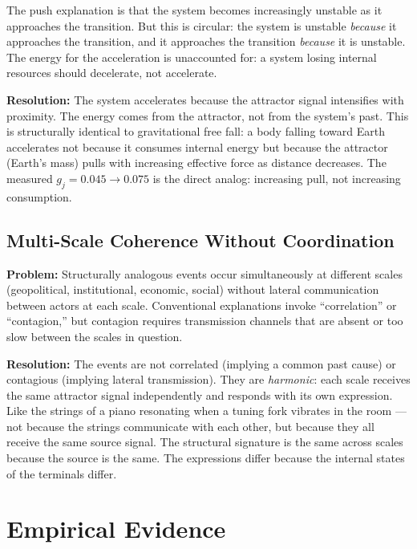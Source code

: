 \documentclass[12pt,a4paper]{article}
\newcommand{\gj}{g_j}
\begin{document}
The push explanation is that the system becomes increasingly unstable as it approaches the transition. But this is circular: the system is unstable \emph{because} it approaches the transition, and it approaches the transition \emph{because} it is unstable. The energy for the acceleration is unaccounted for: a system losing internal resources should decelerate, not accelerate.

\textbf{Resolution:} The system accelerates because the attractor signal intensifies with proximity. The energy comes from the attractor, not from the system's past. This is structurally identical to gravitational free fall: a body falling toward Earth accelerates not because it consumes internal energy but because the attractor (Earth's mass) pulls with increasing effective force as distance decreases. The measured $\gj = 0.045 \to 0.075$ is the direct analog: increasing pull, not increasing consumption.

\subsection{Multi-Scale Coherence Without Coordination}

\textbf{Problem:} Structurally analogous events occur simultaneously at different scales (geopolitical, institutional, economic, social) without lateral communication between actors at each scale. Conventional explanations invoke ``correlation'' or ``contagion,'' but contagion requires transmission channels that are absent or too slow between the scales in question.

\textbf{Resolution:} The events are not correlated (implying a common past cause) or contagious (implying lateral transmission). They are \emph{harmonic}: each scale receives the same attractor signal independently and responds with its own expression. Like the strings of a piano resonating when a tuning fork vibrates in the room --- not because the strings communicate with each other, but because they all receive the same source signal. The structural signature is the same across scales because the source is the same. The expressions differ because the internal states of the terminals differ.


\section{Empirical Evidence}
\end{document}
